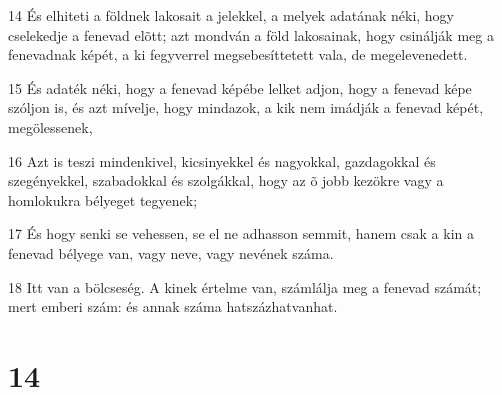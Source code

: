 \par 14 És elhiteti a földnek lakosait a jelekkel, a melyek adatának néki, hogy cselekedje a fenevad elõtt; azt mondván a föld lakosainak, hogy csinálják meg a fenevadnak képét, a ki fegyverrel megsebesíttetett vala,  de megelevenedett.
\par 15 És adaték néki, hogy a fenevad képébe lelket adjon, hogy a fenevad képe szóljon is, és azt mívelje, hogy mindazok, a kik nem imádják a fenevad képét, megölessenek,
\par 16 Azt is teszi mindenkivel, kicsinyekkel és nagyokkal, gazdagokkal és szegényekkel, szabadokkal és szolgákkal, hogy az õ jobb kezökre vagy a homlokukra bélyeget tegyenek;
\par 17 És hogy senki se vehessen, se el ne adhasson semmit, hanem csak a kin a fenevad bélyege van, vagy neve, vagy nevének  száma.
\par 18 Itt van a bölcseség. A kinek értelme van, számlálja meg a fenevad számát; mert emberi szám: és annak száma hatszázhatvanhat.

\chapter{14}

